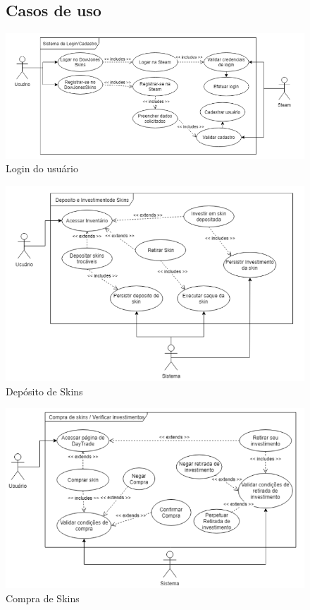   \begin{figure}[!htb]
 \subsection{Casos de uso}
        \centering
        \includegraphics[scale=0.6]{Imagens/login.png}
        \caption{Login do usuário}
 \end{figure}

  \begin{figure}[!htb]
        \centering
        \includegraphics[scale=0.6]{Imagens/deposito.png}
        \caption{Depósito de Skins}
 \end{figure}

  \begin{figure}[!htb]
        \centering
        \includegraphics[scale=0.6]{Imagens/compra.png}
        \caption{Compra de Skins}
 \end{figure}


